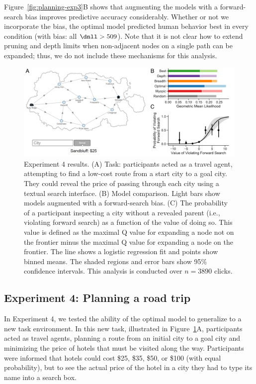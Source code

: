 Figure~\ref{fig:planning-exp3}B shows that augmenting the models with a forward-search bias improves predictive accuracy considerably. Whether or not we incorporate the bias, the optimal model predicted human behavior best in every condition (with bias: all $\dnll > 509$). Note that it is not clear how to extend pruning and depth limits when non-adjacent nodes on a single path can be expanded; thus, we do not include these mechanisms for this analysis.


\begin{figure}[t!]
  \centering
  \includegraphics[width=\textwidth]{figs/planning/fig6.pdf}
  \caption{Experiment 4 results. 
    (A) Task: participants acted as a travel agent, attempting to find a low-cost route from a start city to a goal city. They could reveal the price of passing through each city using a textual search interface.
    (B) Model comparison. Light bars show models augmented with a forward-search bias.
    (C) The probability of a participant inspecting a city without a revealed parent (i.e., violating forward search) as a function of the value of doing so. This value is defined as the maximal Q value for expanding a node not on the frontier minus the maximal Q value for expanding a node on the frontier. The line shows a logistic regression fit and points show binned means. The shaded regions and error bars show 95\% confidence intervals. This analysis is conducted over $n=3890$ clicks.
  }
  \label{fig:planning-exp4}
\end{figure}


\subsection{Experiment 4: Planning a road trip}\label{sec:planning-results4}

In Experiment 4, we tested the ability of the optimal model to generalize to a new task environment. In this new task, illustrated in Figure~\ref{fig:planning-exp4}A, participants acted as travel agents, planning a route from an initial city to a goal city and minimizing the price of hotels that must be visited along the way. Participants were informed that hotels could cost \$25, \$35, \$50, or \$100 (with equal probability), but to see the actual price of the hotel in a city they had to type its name into a search box.

